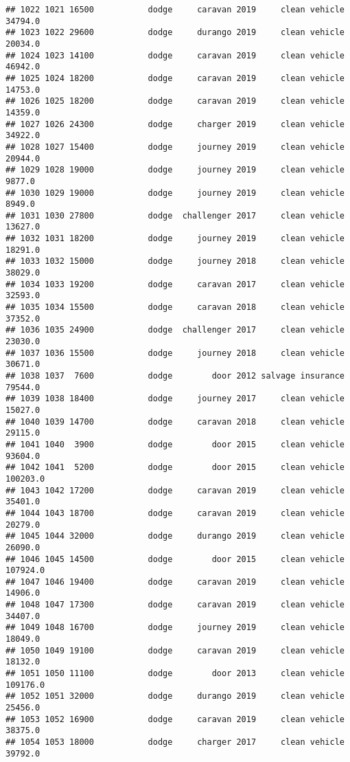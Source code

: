 \documentclass[
]{article}
\begin{document}
\begin{verbatim}
## 1022 1021 16500           dodge     caravan 2019     clean vehicle   34794.0
## 1023 1022 29600           dodge     durango 2019     clean vehicle   20034.0
## 1024 1023 14100           dodge     caravan 2019     clean vehicle   46942.0
## 1025 1024 18200           dodge     caravan 2019     clean vehicle   14753.0
## 1026 1025 18200           dodge     caravan 2019     clean vehicle   14359.0
## 1027 1026 24300           dodge     charger 2019     clean vehicle   34922.0
## 1028 1027 15400           dodge     journey 2019     clean vehicle   20944.0
## 1029 1028 19000           dodge     journey 2019     clean vehicle    9877.0
## 1030 1029 19000           dodge     journey 2019     clean vehicle    8949.0
## 1031 1030 27800           dodge  challenger 2017     clean vehicle   13627.0
## 1032 1031 18200           dodge     journey 2019     clean vehicle   18291.0
## 1033 1032 15000           dodge     journey 2018     clean vehicle   38029.0
## 1034 1033 19200           dodge     caravan 2017     clean vehicle   32593.0
## 1035 1034 15500           dodge     caravan 2018     clean vehicle   37352.0
## 1036 1035 24900           dodge  challenger 2017     clean vehicle   23030.0
## 1037 1036 15500           dodge     journey 2018     clean vehicle   30671.0
## 1038 1037  7600           dodge        door 2012 salvage insurance   79544.0
## 1039 1038 18400           dodge     journey 2017     clean vehicle   15027.0
## 1040 1039 14700           dodge     caravan 2018     clean vehicle   29115.0
## 1041 1040  3900           dodge        door 2015     clean vehicle   93604.0
## 1042 1041  5200           dodge        door 2015     clean vehicle  100203.0
## 1043 1042 17200           dodge     caravan 2019     clean vehicle   35401.0
## 1044 1043 18700           dodge     caravan 2019     clean vehicle   20279.0
## 1045 1044 32000           dodge     durango 2019     clean vehicle   26090.0
## 1046 1045 14500           dodge        door 2015     clean vehicle  107924.0
## 1047 1046 19400           dodge     caravan 2019     clean vehicle   14906.0
## 1048 1047 17300           dodge     caravan 2019     clean vehicle   34407.0
## 1049 1048 16700           dodge     journey 2019     clean vehicle   18049.0
## 1050 1049 19100           dodge     caravan 2019     clean vehicle   18132.0
## 1051 1050 11100           dodge        door 2013     clean vehicle  109176.0
## 1052 1051 32000           dodge     durango 2019     clean vehicle   25456.0
## 1053 1052 16900           dodge     caravan 2019     clean vehicle   38375.0
## 1054 1053 18000           dodge     charger 2017     clean vehicle   39792.0

\end{verbatim}
\end{document}
